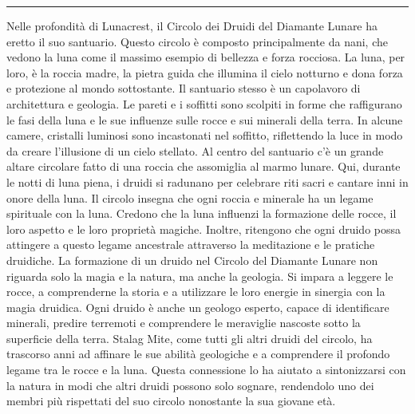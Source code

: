 \begin{center}\rule{0.5\linewidth}{0.5pt}\end{center}

Nelle profondità di Lunacrest, il Circolo dei Druidi del Diamante Lunare
ha eretto il suo santuario. Questo circolo è composto principalmente da
nani, che vedono la luna come il massimo esempio di bellezza e forza
rocciosa. La luna, per loro, è la roccia madre, la pietra guida che
illumina il cielo notturno e dona forza e protezione al mondo
sottostante. Il santuario stesso è un capolavoro di architettura e
geologia. Le pareti e i soffitti sono scolpiti in forme che raffigurano
le fasi della luna e le sue influenze sulle rocce e sui minerali della
terra. In alcune camere, cristalli luminosi sono incastonati nel
soffitto, riflettendo la luce in modo da creare l'illusione di un cielo
stellato. Al centro del santuario c'è un grande altare circolare fatto
di una roccia che assomiglia al marmo lunare. Qui, durante le notti di
luna piena, i druidi si radunano per celebrare riti sacri e cantare inni
in onore della luna. Il circolo insegna che ogni roccia e minerale ha un
legame spirituale con la luna. Credono che la luna influenzi la
formazione delle rocce, il loro aspetto e le loro proprietà magiche.
Inoltre, ritengono che ogni druido possa attingere a questo legame
ancestrale attraverso la meditazione e le pratiche druidiche. La
formazione di un druido nel Circolo del Diamante Lunare non riguarda
solo la magia e la natura, ma anche la geologia. Si impara a leggere le
rocce, a comprenderne la storia e a utilizzare le loro energie in
sinergia con la magia druidica. Ogni druido è anche un geologo esperto,
capace di identificare minerali, predire terremoti e comprendere le
meraviglie nascoste sotto la superficie della terra. Stalag Mite, come
tutti gli altri druidi del circolo, ha trascorso anni ad affinare le sue
abilità geologiche e a comprendere il profondo legame tra le rocce e la
luna. Questa connessione lo ha aiutato a sintonizzarsi con la natura in
modi che altri druidi possono solo sognare, rendendolo uno dei membri
più rispettati del suo circolo nonostante la sua giovane età.
